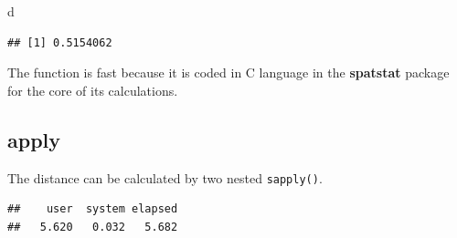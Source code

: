 \documentclass[
  12pt,
  american,
  a4paper,
  extrafontsizes,onecolumn,openright
  ]{memoir}
\newenvironment{Shaded}{\begin{snugshade}}{\end{snugshade}}
\newcommand{\ControlFlowTok}[1]{\textcolor[rgb]{0.13,0.29,0.53}{\textbf{#1}}}
\newcommand{\DecValTok}[1]{\textcolor[rgb]{0.00,0.00,0.81}{#1}}
\newcommand{\FunctionTok}[1]{\textcolor[rgb]{0.00,0.00,0.00}{#1}}
\newcommand{\NormalTok}[1]{#1}
\newcommand{\OtherTok}[1]{\textcolor[rgb]{0.56,0.35,0.01}{#1}}
\newcommand{\SpecialCharTok}[1]{\textcolor[rgb]{0.00,0.00,0.00}{#1}}
\begin{document}
\begin{Shaded}
\begin{Highlighting}[]
\NormalTok{d}
\end{Highlighting}
\end{Shaded}

\begin{verbatim}
## [1] 0.5154062
\end{verbatim}

\normalsize

The function is fast because it is coded in C language in the \textbf{spatstat} package for the core of its calculations.

\hypertarget{apply}{%
\subsection{apply}\label{apply}}

The distance can be calculated by two nested \texttt{sapply()}.

\scriptsize

\begin{Shaded}
\end{Shaded}

\begin{verbatim}
##    user  system elapsed 
##   5.620   0.032   5.682
\end{verbatim}
\end{document}

